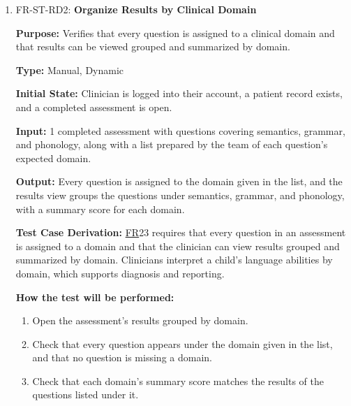 \documentclass[12pt, titlepage]{article}
\newcommand{\srsfr}[1]{\href{https://github.com/Nour-Fawaz/MacaBoca/blob/main/pdfs/SRS/SRS.pdf}{FR}}
\renewcommand{\_}{\oldunderscore\allowbreak}
\begin{document}
\begin{enumerate}
  \item FR-ST-RD2: \textbf{Organize Results by Clinical Domain\\}
  \begin{mdframed}[linewidth=0.5mm]
      \textbf{Purpose:} Verifies that every question is assigned to a clinical domain and that results can be viewed grouped and summarized by domain. \par
      \textbf{Type:} Manual, Dynamic \par
      \textbf{Initial State:} Clinician is logged into their account, a patient record exists, and a completed assessment is open. \par
      \textbf{Input:} 1 completed assessment with questions covering semantics, grammar, and phonology, along with a list prepared by the team of each question's expected domain. \par
      \textbf{Output:} Every question is assigned to the domain given in the list, and the results view groups the questions under semantics, grammar, and phonology, with a summary score for each domain. \par
      \textbf{Test Case Derivation:} \srsfr*{23} requires that every question in an assessment is assigned to a domain and that the clinician can view results grouped and summarized by domain. Clinicians interpret a child's language abilities by domain, which supports diagnosis and reporting. \par
      \textbf{How the test will be performed:}
      \begin{enumerate}
        \item[1.] Open the assessment's results grouped by domain.
        \item[2.] Check that every question appears under the domain given in the list, and that no question is missing a domain.
        \item[3.] Check that each domain's summary score matches the results of the questions listed under it.
      \end{enumerate}
  \end{mdframed}


\end{enumerate}
\end{document}

